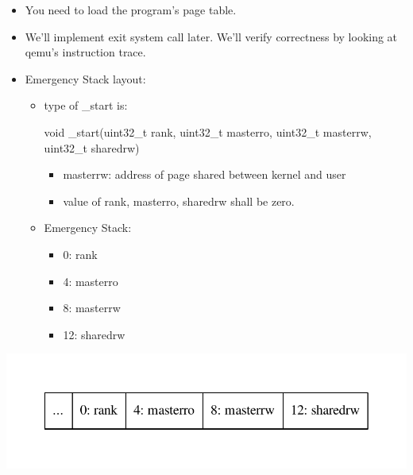 \documentclass[]{book}
\newenvironment{Shaded}{}{}
\newcommand{\DataTypeTok}[1]{\textcolor[rgb]{0.50,0.00,0.00}{{#1}}}
\newcommand{\NormalTok}[1]{{#1}}
\begin{document}
\begin{itemize}
\itemsep1pt\parskip0pt
\item
  You need to load the program's page table.
\item
  We'll implement exit system call later. We'll verify correctness by
  looking at qemu's instruction trace.
\item
  Emergency Stack layout:

  \begin{itemize}
  \item
    type of \_start is:

\begin{Shaded}
\begin{Highlighting}[]
  \DataTypeTok{void} \NormalTok{_start(}\DataTypeTok{uint32_t} \NormalTok{rank, }\DataTypeTok{uint32_t} \NormalTok{masterro, }\DataTypeTok{uint32_t} \NormalTok{masterrw, }\DataTypeTok{uint32_t} \NormalTok{sharedrw)}
\end{Highlighting}
\end{Shaded}

    \begin{itemize}
    \itemsep1pt\parskip0pt
    \item
      masterrw: address of page shared between kernel and user
    \item
      value of rank, masterro, sharedrw shall be zero.
    \end{itemize}
  \item
    Emergency Stack:

    \begin{itemize}
    \itemsep1pt\parskip0pt
    \item
      0: rank
    \item
      4: masterro
    \item
      8: masterrw
    \item
      12: sharedrw
    \end{itemize}
  \end{itemize}
\end{itemize}

\includegraphics{graphviz-images/f3006b44bfcfbb88aaffa02f09c92c6ec0ebc1e4.pdf}
\end{document}
